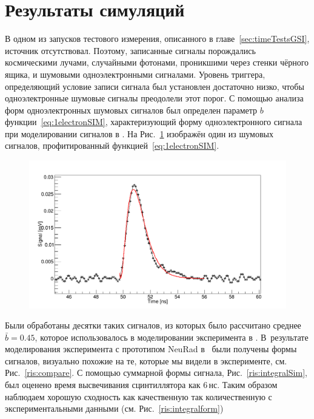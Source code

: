 \section{Результаты симуляций}

В одном из запусков тестового измерения, описанного в главе~\ref{sec:timeTestsGSI}, источник отсутствовал. Поэтому, записанные сигналы порождались космическими лучами, случайными фотонами, проникшими через стенки чёрного ящика, и шумовыми одноэлектронными сигналами. Уровень триггера, определяющий условие записи сигнала был установлен достаточно низко, чтобы одноэлектронные шумовые сигналы преодолели этот порог. С помощью анализа форм одноэлектронных шумовых сигналов был определен параметр $b$ функции~\eqref{eq:1electronSIM}, характеризующий форму одноэлектронного сигнала при моделировании сигналов в \er.
На Рис.~\ref{ris:1pesignalexp} изображён один из шумовых сигналов, профитированный функцией~\eqref{eq:1electronSIM}. 

\begin{figure}[!ht]
	\centering
	\includegraphics[width=\linewidth]{1pesignalexp.png}
	\label{ris:1pesignalexp}
\end{figure}

Были обработаны десятки таких сигналов, из которых было рассчитано среднее $\bar{b}=0.45$, которое использовалось в моделировании эксперимента в \er.
В~результате моделирования эксперимента с прототипом NeuRad в \er\, были получены формы сигналов, визуально похожие на те, которые мы видели в эксперименте, см. Рис.~\ref{ris:compare}.
С помощью суммарной формы сигнала, Рис.~\ref{ris:integralSim}, был оценено время высвечивания сцинтиллятора как 6\,нс. Таким образом наблюдаем хорошую сходность как качественную так количественную с экспериментальными данными (см. Рис.~\ref{ris:integralform})

